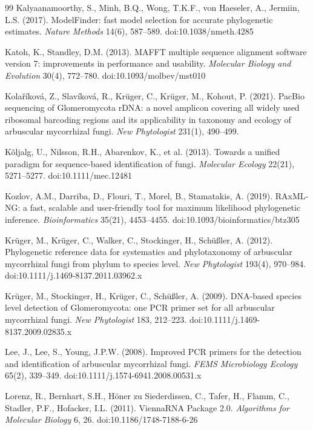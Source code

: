 \documentclass[11pt]{article}
\begin{document}
\begin{thebibliography}{99}
Kalyaanamoorthy, S., Minh, B.Q., Wong, T.K.F., von Haeseler, A., Jermiin, L.S. (2017). ModelFinder: fast model
selection for accurate phylogenetic estimates. \emph{Nature Methods} 14(6), 587--589. doi:10.1038/nmeth.4285

Katoh, K., Standley, D.M. (2013). MAFFT multiple sequence alignment software
version 7: improvements in performance and usability. \emph{Molecular Biology and
Evolution} 30(4), 772--780. doi:10.1093/molbev/mst010

Kola\v{r}\'ikov\'a, Z., Slav\'ikov\'a, R., Kr\"uger, C., Kr\"uger, M., Kohout, P. (2021).
PacBio sequencing of Glomeromycota rDNA: a novel amplicon covering all widely used ribosomal
barcoding regions and its applicability in taxonomy and ecology of arbuscular mycorrhizal
fungi. \emph{New Phytologist} 231(1), 490--499.

K\~oljalg, U., Nilsson, R.H., Abarenkov, K., et al. (2013). Towards a unified
paradigm for sequence-based identification of fungi. \emph{Molecular Ecology}
22(21), 5271--5277. doi:10.1111/mec.12481

Kozlov, A.M., Darriba, D., Flouri, T., Morel, B., Stamatakis, A. (2019).
RAxML-NG: a fast, scalable and user-friendly tool for maximum likelihood
phylogenetic inference. \emph{Bioinformatics} 35(21), 4453--4455.
doi:10.1093/bioinformatics/btz305

Kr\"uger, M., Kr\"uger, C., Walker, C., Stockinger, H., Sch\"u\ss ler, A. (2012).
Phylogenetic reference data for systematics and phylotaxonomy of arbuscular
mycorrhizal fungi from phylum to species level. \emph{New Phytologist} 193(4),
970--984. doi:10.1111/j.1469-8137.2011.03962.x

Kr\"uger, M., Stockinger, H., Kr\"uger, C., Sch\"u\ss ler, A. (2009). DNA-based species level
detection of Glomeromycota: one PCR primer set for all arbuscular mycorrhizal fungi.
\emph{New Phytologist} 183, 212--223. doi:10.1111/j.1469-8137.2009.02835.x

Lee, J., Lee, S., Young, J.P.W. (2008). Improved PCR primers for the detection and
identification of arbuscular mycorrhizal fungi. \emph{FEMS Microbiology Ecology} 65(2), 339--349. doi:10.1111/j.1574-6941.2008.00531.x

Lorenz, R., Bernhart, S.H., H\"oner zu Siederdissen, C., Tafer, H., Flamm, C., Stadler, P.F., Hofacker, I.L.
(2011). ViennaRNA Package 2.0. \emph{Algorithms for Molecular Biology} 6, 26. doi:10.1186/1748-7188-6-26


\end{thebibliography}
\end{document}
